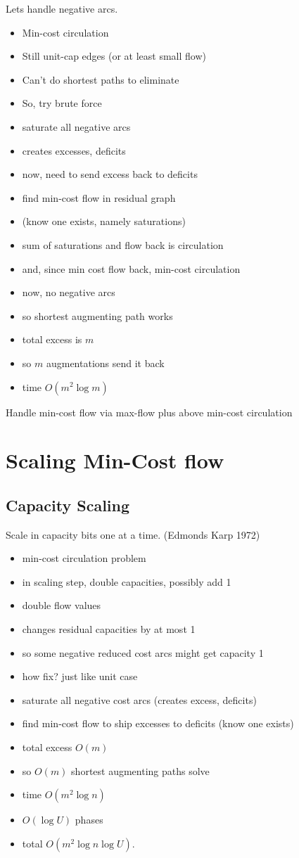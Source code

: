 \documentclass{article}
\begin{document}
Lets handle negative arcs.
\begin{itemize}
\item Min-cost circulation
\item Still unit-cap edges (or at least small flow)
\item Can't do shortest paths to eliminate
\item So, try brute force
\item saturate all negative arcs
\item creates excesses, deficits
\item now, need to send excess back to deficits
\item find min-cost flow in residual graph
\item (know one exists, namely saturations)
\item sum of saturations and flow back is circulation
\item and, since min cost flow back, min-cost circulation
\item now, no negative arcs
\item so shortest augmenting path works
\item total excess is $m$
\item so $m$ augmentations send it back
\item time $O(m^2\log m)$
\end{itemize}

Handle min-cost flow via max-flow plus above min-cost circulation


\section*{Scaling Min-Cost flow}


\subsection*{Capacity Scaling}

Scale in capacity bits one at a time. (Edmonds Karp 1972)
\begin{itemize}
\item min-cost circulation problem
\item in scaling step, double capacities, possibly add 1
\item double flow values
\item changes residual capacities by at most 1
\item so some negative reduced cost arcs might get capacity 1
\item how fix? just like unit case
\item saturate all negative cost arcs (creates excess, deficits)
\item find min-cost flow to ship excesses to deficits (know one exists)
\item total excess $O(m)$
\item so $O(m)$ shortest augmenting paths solve
\item time $O(m^2 \log n)$
\item $O(\log U)$ phases
\item total $O(m^2 \log n \log U)$.
\end{itemize}
\end{document}
